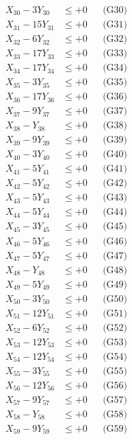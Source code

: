 \documentclass[a4paper,10pt]{article}
\begin{document}
{\begin{align}
\allowbreak
X_{30} - 3Y_{30} &\leq +0 && \text{(G30)} \\
X_{31} - 15Y_{31} &\leq +0 && \text{(G31)} \\
X_{32} - 6Y_{32} &\leq +0 && \text{(G32)} \\
X_{33} - 17Y_{33} &\leq +0 && \text{(G33)} \\
X_{34} - 17Y_{34} &\leq +0 && \text{(G34)} \\
X_{35} - 3Y_{35} &\leq +0 && \text{(G35)} \\
X_{36} - 17Y_{36} &\leq +0 && \text{(G36)} \\
X_{37} - 9Y_{37} &\leq +0 && \text{(G37)} \\
X_{38} - Y_{38} &\leq +0 && \text{(G38)} \\
X_{39} - 9Y_{39} &\leq +0 && \text{(G39)} \\
\allowbreak
X_{40} - 3Y_{40} &\leq +0 && \text{(G40)} \\
X_{41} - 5Y_{41} &\leq +0 && \text{(G41)} \\
X_{42} - 5Y_{42} &\leq +0 && \text{(G42)} \\
X_{43} - 5Y_{43} &\leq +0 && \text{(G43)} \\
X_{44} - 5Y_{44} &\leq +0 && \text{(G44)} \\
X_{45} - 3Y_{45} &\leq +0 && \text{(G45)} \\
X_{46} - 5Y_{46} &\leq +0 && \text{(G46)} \\
X_{47} - 5Y_{47} &\leq +0 && \text{(G47)} \\
X_{48} - Y_{48} &\leq +0 && \text{(G48)} \\
X_{49} - 5Y_{49} &\leq +0 && \text{(G49)} \\
\allowbreak
X_{50} - 3Y_{50} &\leq +0 && \text{(G50)} \\
X_{51} - 12Y_{51} &\leq +0 && \text{(G51)} \\
X_{52} - 6Y_{52} &\leq +0 && \text{(G52)} \\
X_{53} - 12Y_{53} &\leq +0 && \text{(G53)} \\
X_{54} - 12Y_{54} &\leq +0 && \text{(G54)} \\
X_{55} - 3Y_{55} &\leq +0 && \text{(G55)} \\
X_{56} - 12Y_{56} &\leq +0 && \text{(G56)} \\
X_{57} - 9Y_{57} &\leq +0 && \text{(G57)} \\
X_{58} - Y_{58} &\leq +0 && \text{(G58)} \\
X_{59} - 9Y_{59} &\leq +0 && \text{(G59)} \\
\allowbreak

\end{align}}
\end{document}
